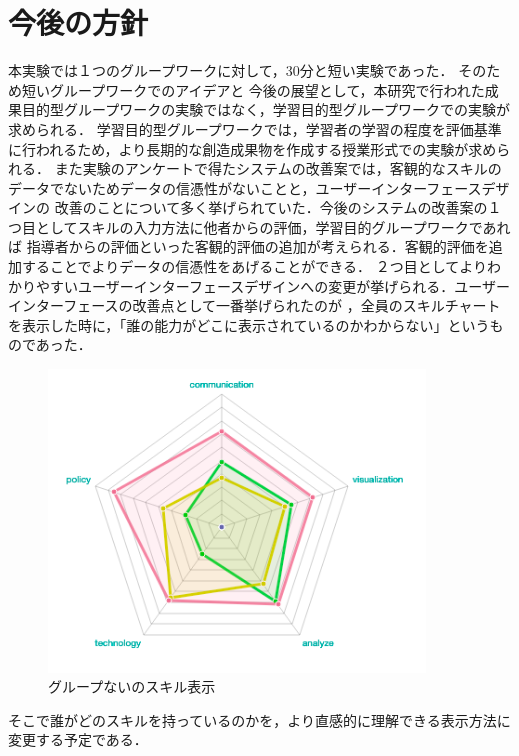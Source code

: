 \documentclass{funthesis}
\begin{document}
\section{今後の方針}
本実験では１つのグループワークに対して，30分と短い実験であった．
そのため短いグループワークでのアイデアと
今後の展望として，本研究で行われた成果目的型グループワークの実験ではなく，学習目的型グループワークでの実験が求められる．
学習目的型グループワークでは，学習者の学習の程度を評価基準に行われるため，より長期的な創造成果物を作成する授業形式での実験が求められる．
また実験のアンケートで得たシステムの改善案では，客観的なスキルのデータでないためデータの信憑性がないことと，ユーザーインターフェースデザインの
改善のことについて多く挙げられていた．今後のシステムの改善案の１つ目としてスキルの入力方法に他者からの評価，学習目的グループワークであれば
指導者からの評価といった客観的評価の追加が考えられる．客観的評価を追加することでよりデータの信憑性をあげることができる．
２つ目としてよりわかりやすいユーザーインターフェースデザインへの変更が挙げられる．ユーザーインターフェースの改善点として一番挙げられたのが
，全員のスキルチャートを表示した時に，「誰の能力がどこに表示されているのかわからない」というものであった．

\begin{figure}[H]
 \centering
   \includegraphics[width=100mm]{figures/groupChart.png}
 \caption{グループないのスキル表示}
 \label{testtest}
\end{figure}

そこで誰がどのスキルを持っているのかを，より直感的に理解できる表示方法に変更する予定である．\\






\end{document}
